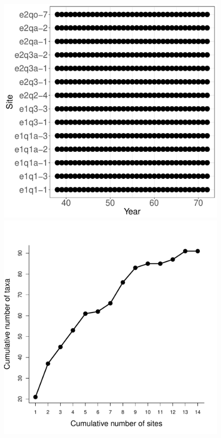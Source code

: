 \documentclass[11pt, oneside]{article}
\begin{document}
\begin{figure}[h!]
\includegraphics[scale = 0.4]{hays-plants-compagnoni_spatiotemporal_sampling_effort.pdf}
\includegraphics[scale = 0.4]{hays-plants-compagnoni_species_accumulation_space.pdf}

\end{figure}
\end{document}
